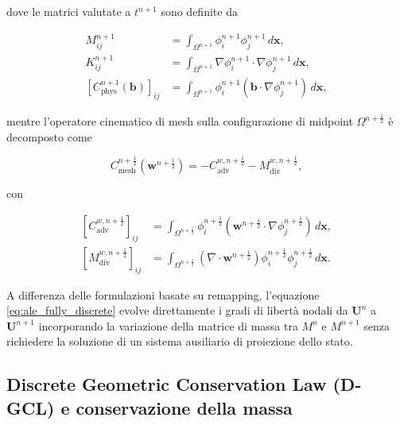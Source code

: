 dove le matrici valutate a $t^{n+1}$ sono definite da

\begin{equation}
\begin{aligned}
M_{ij}^{n+1}
&=
\int_{\Omega^{n+1}}
\phi_i^{n+1}\phi_j^{n+1}
\,d\mathbf{x},
\\
K_{ij}^{n+1}
&=
\int_{\Omega^{n+1}}
\nabla\phi_i^{n+1}\cdot\nabla\phi_j^{n+1}
\,d\mathbf{x},
\\
\left[C_{\mathrm{phys}}^{n+1}(\mathbf{b})\right]_{ij}
&=
\int_{\Omega^{n+1}}
\phi_i^{n+1}(\mathbf{b}\cdot\nabla\phi_j^{n+1})
\,d\mathbf{x},
\end{aligned}
\label{eq:ale_matrices_np1}
\end{equation}

mentre l'operatore cinematico di mesh sulla configurazione di midpoint $\Omega^{n+\frac12}$ è decomposto come

\begin{equation}
C_{\mathrm{mesh}}^{n+\frac12}(\mathbf{w}^{n+\frac12})
=
-C_{\mathrm{adv}}^{w,n+\frac12}
-M_{\mathrm{div}}^{w,n+\frac12},
\label{eq:c_mesh_discrete_split}
\end{equation}

con

\begin{equation}
\begin{aligned}
\left[C_{\mathrm{adv}}^{w,n+\frac12}\right]_{ij}
&=
\int_{\Omega^{n+\frac12}}
\phi_i^{n+\frac12}
\left(
\mathbf{w}^{n+\frac12}\cdot\nabla\phi_j^{n+\frac12}
\right)
\,d\mathbf{x},
\\
\left[M_{\mathrm{div}}^{w,n+\frac12}\right]_{ij}
&=
\int_{\Omega^{n+\frac12}}
\left(\nabla\cdot\mathbf{w}^{n+\frac12}\right)
\phi_i^{n+\frac12}\phi_j^{n+\frac12}
\,d\mathbf{x}.
\end{aligned}
\label{eq:c_adv_and_m_div_defs}
\end{equation}

A differenza delle formulazioni basate su remapping, l'equazione \eqref{eq:ale_fully_discrete} evolve direttamente i gradi di libertà nodali da $\mathbf{U}^n$ a $\mathbf{U}^{n+1}$ incorporando la variazione della matrice di massa tra $M^n$ e $M^{n+1}$ senza richiedere la soluzione di un sistema ausiliario di proiezione dello stato.

\subsection{Discrete Geometric Conservation Law (D-GCL) e conservazione della massa}
\label{subsec:dgcl}

